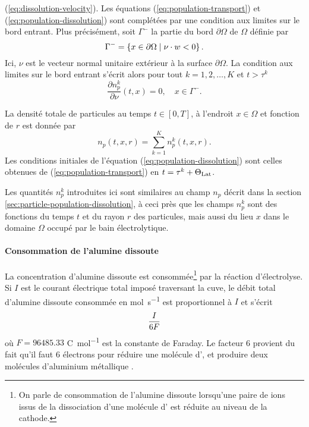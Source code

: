(\ref{eq:dissolution-velocity}). Les équations
(\ref{eq:population-transport}) et (\ref{eq:population-dissolution})
sont complétées par une condition aux limites sur le bord entrant. Plus
précisément, soit $\Gamma^-$ la partie du bord $\partial \Omega$ de $\Omega$
définie par
\begin{equation}\label{eq:np-bc}
  \Gamma^- = \left\{ x\in\partial\Omega \mid \nu \cdot  w
  < 0 \right\}.
\end{equation}
Ici, $\nu$ est le vecteur normal unitaire extérieur à la surface
$\partial \Omega$. La condition aux limites sur le bord entrant s'écrit
alors pour tout $k = 1, 2, \dots, K$ et $t > \tau^k$
\begin{equation}
\frac{\partial n_p^k}{\partial \nu}(t, x) = 0, \quad x\in\Gamma^-.
\end{equation}

La densité totale de particules au temps $t \in [0, T]$, à l'endroit
$x\in\Omega$ et fonction de $r$ est donnée par
\begin{equation}
  n_p(t, x, r) = \sum_{k=1}^K n_p^k(t, x, r).
\end{equation}
Les conditions initiales de l'équation
(\ref{eq:population-dissolution}) sont celles obtenues de
(\ref{eq:population-transport}) en $t = \tau^k + \Theta_\text{Lat}$.

\begin{remarque}
Les quantités $n_p^k$ introduites ici sont similaires au champ $n_p$
décrit dans la section \ref{sec:particle-population-dissolution}, à
ceci près que les champs $n_p^k$ sont des fonctions du temps $t$ et du
rayon $r$ des particules, mais aussi du lieu $x$ dans le domaine
$\Omega$ occupé par le bain électrolytique.
\end{remarque}

\paragraph{Consommation de l'alumine dissoute}
La concentration d'alumine dissoute est consommée\footnote{On parle de
consommation de l'alumine dissoute lorsqu'une paire de ions  issus de
la dissociation d'une molécule d' est réduite au niveau de
la cathode.} par la réaction
d'électrolyse. Si $I$ est le courant électrique total imposé
traversant la cuve, le débit total d'alumine dissoute consommée en
\si{\mol\per\second} est proportionnel à $I$ et s'écrit
\begin{equation}\label{eq:mass-consumption}
  \frac{I}{6F}
\end{equation}
où $F = \num{96485.33}$ \si{\coulomb\per\mol} est la constante de
Faraday. Le facteur \num{6} provient du fait qu'il
faut \num{6} électrons pour réduire une molécule d', et
produire deux molécules d'aluminium métallique .

